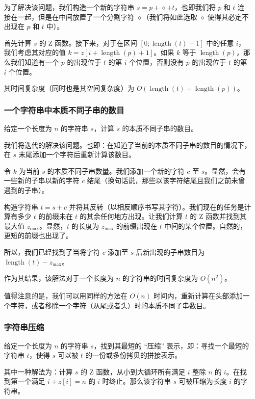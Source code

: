 为了解决该问题，我们构造一个新的字符串 $s = p + \diamond + t$，也即我们将 $p$ 和 $t$ 连接在一起，但是在中间放置了一个分割字符 $\diamond$（我们将如此选取  $\diamond$ 使得其必定不出现在 $p$ 和 $t$ 中）。

首先计算 $s$ 的 Z 函数。接下来，对于在区间 $[0; \operatorname{length}(t) - 1]$ 中的任意 $i$，我们考虑其对应的值 $k = z[i + \operatorname{length}(p) + 1]$。如果 $k$ 等于 $\operatorname{length}(p)$，那么我们知道有一个 $p$ 的出现位于 $t$ 的第 $i$ 个位置，否则没有 $p$ 的出现位于 $t$ 的第 $i$ 个位置。

其时间复杂度（同时也是其空间复杂度）为 $O(\operatorname{length}(t) + \operatorname{length}(p))$。

\subsubsection{一个字符串中本质不同子串的数目}

给定一个长度为 $n$ 的字符串 $s$，计算 $s$ 的本质不同子串的数目。

我们将迭代的解决该问题。也即：在知道了当前的本质不同子串的数目的情况下，在 $s$ 末尾添加一个字符后重新计算该数目。

令 $k$ 为当前 $s$ 的本质不同子串数量。我们添加一个新的字符 $c$ 至 $s$。显然，会有一些新的子串以新的字符 $c$ 结尾（换句话说，那些以该字符结尾且我们之前未曾遇到的子串）。

构造字符串 $t = s + c$ 并将其反转（以相反顺序书写其字符）。我们现在的任务是计算有多少 $t$ 的前缀未在 $t$ 的其余任何地方出现。让我们计算 $t$ 的 Z 函数并找到其最大值 $z_{\max}$。显然，$t$ 的长度为 $z_{\max}$ 的前缀出现在 $t$ 中间的某个位置。自然的，更短的前缀也出现了。

所以，我们已经找到了当将字符 $c$ 添加至 $s$ 后新出现的子串数目为 $\operatorname{length}(t) - z_{\max}$。

作为其结果，该解法对于一个长度为 $n$ 的字符串的时间复杂度为 $O(n^2)$。

值得注意的是，我们可以用同样的方法在 $O(n)$ 时间内，重新计算在头部添加一个字符，或者移除一个字符（从尾或者头）时的本质不同子串数目。

\subsubsection{字符串压缩}

给定一个长度为 $n$ 的字符串 $s$，找到其最短的 “压缩” 表示，即：寻找一个最短的字符串 $t$，使得 $s$ 可以被 $t$ 的一份或多份拷贝的拼接表示。

其中一种解法为：计算 $s$ 的 Z 函数，从小到大循环所有满足 $i$ 整除 $n$ 的 $i$。在找到第一个满足 $i + z[i] = n$ 的 $i$ 时终止。那么该字符串 $s$ 可被压缩为长度 $i$ 的字符串。


